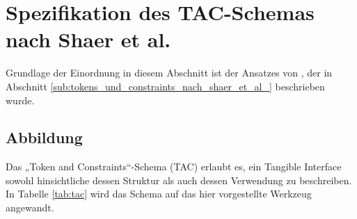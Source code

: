 
\section{Spezifikation des TAC-Schemas nach Shaer et al.} %
\label{sec:spezifikation_des_tac_schemas_nach_shaer_et_al_}

Grundlage der Einordnung in diesem Abschnitt ist der Ansatzes von \citet{Shaer04}, der in Abschnitt \ref{sub:tokens_und_constraints_nach_shaer_et_al_} beschrieben wurde.

\subsection{Abbildung}

Das „Token and Constraints“-Schema (\gls{TAC}) erlaubt es, ein Tangible Interface sowohl hinsichtliche dessen Struktur als auch dessen Verwendung zu beschreiben. In Tabelle \ref{tab:tac} wird das Schema auf das hier vorgestellte Werkzeug angewandt. 

